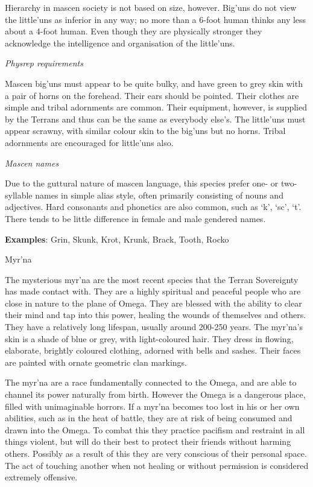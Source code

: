 \documentclass{scrbook}
\begin{document}
Hierarchy in mascen society is not based on size, however. Big'uns do not view the little'uns as inferior in any way; no more than a 6-foot human thinks any less about a 4-foot human. Even though they are physically stronger they acknowledge the intelligence and organisation of the little'uns.

\textit{Physrep requirements}

Mascen big'uns must appear to be quite bulky, and have green to grey skin with a pair of horns on the forehead. Their ears should be pointed. Their clothes are simple and tribal adornments are common. Their equipment, however, is supplied by the Terrans and thus can be the same as everybody else's. The little'uns must appear scrawny, with similar colour skin to the big'uns but no horns. Tribal adornments are encouraged for little'uns also.

\textit{Mascen names}

Due to the guttural nature of mascen language, this species prefer one- or two-syllable names in simple alias style, often primarily consisting of nouns and adjectives. Hard consonants and phonetics are also common, such as `k', `sc', `t'. There tends to be little difference in female and male gendered names.

\textbf{Examples}: Grin, Skunk, Krot, Krunk, Brack, Tooth, Rocko

Myr'na

The mysterious myr'na are the most recent species that the Terran Sovereignty has made contact with. They are a highly spiritual and peaceful people who are close in nature to the plane of Omega. They are blessed with the ability to clear their mind and tap into this power, healing the wounds of themselves and others. They have a relatively long lifespan, usually around 200-250 years. The myr'na's skin is a shade of blue or grey, with light-coloured hair. They dress in flowing, elaborate, brightly coloured clothing, adorned with bells and sashes. Their faces are painted with ornate geometric clan markings.

The myr'na are a race fundamentally connected to the Omega, and are able to channel its power naturally from birth. However the Omega is a dangerous place, filled with unimaginable horrors. If a myr'na becomes too lost in his or her own abilities, such as in the heat of battle, they are at risk of being consumed and drawn into the Omega. To combat this they practice pacifism and restraint in all things violent, but will do their best to protect their friends without harming others. Possibly as a result of this they are very conscious of their personal space. The act of touching another when not healing or without permission is considered extremely offensive.
\end{document}
